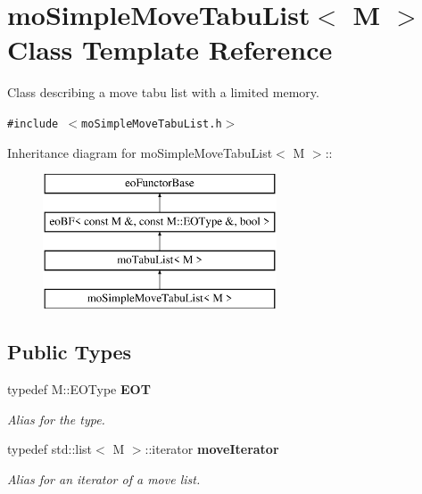 \section{mo\-Simple\-Move\-Tabu\-List$<$ M $>$ Class Template Reference}
\label{classmo_simple_move_tabu_list}
Class describing a move tabu list with a limited memory.  


{\tt \#include $<$mo\-Simple\-Move\-Tabu\-List.h$>$}

Inheritance diagram for mo\-Simple\-Move\-Tabu\-List$<$ M $>$::\begin{figure}[H]
\begin{center}
\leavevmode
\includegraphics[height=4cm]{classmo_simple_move_tabu_list}
\end{center}
\end{figure}
\subsection*{Public Types}
\begin{CompactItemize}
\item 
typedef M::EOType {\bf EOT}\label{classmo_simple_move_tabu_list_w0}

\begin{CompactList}\small\item\em Alias for the type. \item\end{CompactList}\item 
typedef std::list$<$ M $>$::iterator {\bf move\-Iterator}\label{classmo_simple_move_tabu_list_w1}

\begin{CompactList}\small\item\em Alias for an iterator of a move list. \item\end{CompactList}\end{CompactItemize}
